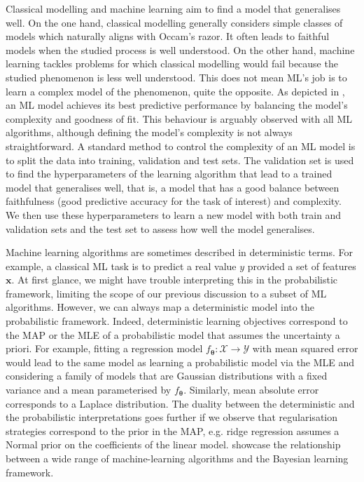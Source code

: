 Classical modelling and machine learning aim to find a model that generalises well.
On the one hand, classical modelling generally considers simple classes of models which naturally aligns with Occam's razor. It often leads to faithful models when the studied process is well understood. On the other hand, machine learning tackles problems for which classical modelling would fail because the studied phenomenon is less well understood. This does not mean ML's job is to learn a complex model of the phenomenon, quite the opposite. As depicted in , an ML model achieves its best predictive performance by balancing the model's complexity and goodness of fit. This behaviour is arguably observed with all ML algorithms, although defining the model's complexity is not always straightforward. A standard method to control the complexity of an ML model is to split the data into training, validation and test sets. The validation set is used to find the hyperparameters of the learning algorithm that lead to a trained model that generalises well, that is, a model that has a good balance between faithfulness (good predictive accuracy for the task of interest) and complexity. We then use these hyperparameters to learn a new model with both train and validation sets and the test set to assess how well the model generalises.

Machine learning algorithms are sometimes described in deterministic terms. For example, a classical ML task is to predict a real value $y$ provided a set of features $\bm x$. At first glance, we might have trouble interpreting this in the probabilistic framework, limiting the scope of our previous discussion to a subset of ML algorithms. However, we can always map a deterministic model into the probabilistic framework. Indeed, deterministic learning objectives correspond to the MAP or the MLE of a probabilistic model that assumes the uncertainty a priori. For example, fitting a regression model $f_{\bm {\theta}}: \mathcal{X} \rightarrow \mathcal{Y}$ with mean squared error would lead to the same model as learning a probabilistic model via the MLE and considering a family of models that are Gaussian distributions with a fixed variance and a mean parameterised by $f_{\bm {\theta}}$. Similarly, mean absolute error corresponds to a Laplace distribution. The duality between the deterministic and the probabilistic interpretations goes further if we observe that regularisation strategies correspond to the prior in the MAP, e.g. ridge regression assumes a Normal prior on the coefficients of the linear model. \citet{khan2021bayesian} showcase the relationship between a wide range of machine-learning algorithms and the Bayesian learning framework.


